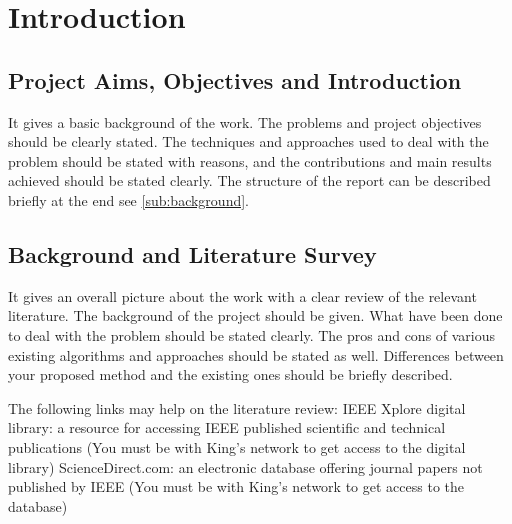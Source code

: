 \section{Introduction}
\subsection{Project Aims, Objectives and Introduction} 
It gives a basic background of the work.  The problems and project objectives should be clearly stated.  The techniques and approaches used to deal with the problem should be stated with reasons, and the contributions and main results achieved should be stated clearly.  The structure of the report can be described briefly at the end see \autoref{sub:background}.
\subsection{Background and Literature Survey} \label{sub:background}
 It gives an overall picture about the work with a clear review of the relevant literature.  The background of the project should be given.  What have been done to deal with the problem should be stated clearly.  The pros and cons of various existing algorithms and approaches should be stated as well.  Differences between your proposed method and the existing ones should be briefly described.

The following links may help on the literature review:
IEEE Xplore digital library: a resource for accessing IEEE published scientific and technical publications (You must be with King's network to get access to the digital library)
ScienceDirect.com: an electronic database offering journal papers not published by IEEE (You must be with King's network to get access to the database)
